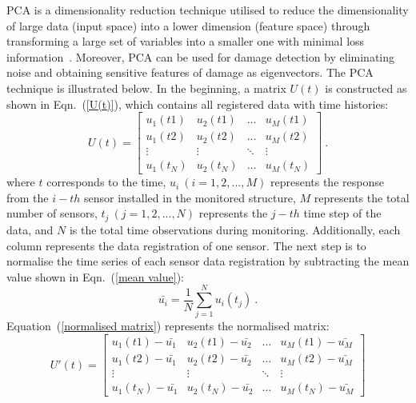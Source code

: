 PCA is a dimensionality reduction technique utilised to reduce the dimensionality of large data (input space) into a lower dimension (feature space) through transforming a large set of variables into a smaller one with minimal loss information~\cite{Jolliffe2002}.
Moreover, PCA can be used for damage detection by eliminating noise and obtaining sensitive features of damage as eigenvectors.
The PCA technique is illustrated below.
In the beginning, a matrix \(U(t)\) is constructed as shown in Eqn.~(\ref{U(t)}), which contains all registered data with time histories:
\begin{equation}
	U(t)=
	\begin{bmatrix}
		u_1{(t1)}       & u_2{(t1)} & \dots & u_M{(t1)} \\
		u_1{(t2)}       & u_2{(t2)} & \dots & u_M{(t2)} \\
		\vdots 			& \vdots 	& \ddots & \vdots \\
		u_1{(t_N)}      & u_2{(t_N)} & \dots & u_M{(t_N)}
	\end{bmatrix}\ .
	\label{U(t)}
\end{equation}
where \(t\) corresponds to the time, \(u_i\ (i = 1, 2, ..., M)\) represents the response from the \(i-th\) sensor installed in the monitored structure, \(M\) represents the total number of sensors, \(t_j\ (j = 1, 2, ..., N)\) represents the \(j-th\) time step of the data, and \(N\) is the total time observations during monitoring.
Additionally, each column represents the data registration of one sensor.
The next step is to normalise the time series of each sensor data registration by subtracting the mean value shown in Eqn.~(\ref{mean value}):
\begin{equation}
	\bar{u_i} = \frac{1}{N}\sum_{j=1}^{N}u_i(t_j)\ .
	\label{mean value}
\end{equation}
Equation~(\ref{normalised matrix}) represents the normalised matrix:
\begin{equation}
	U'(t)=
	\begin{bmatrix}
		u_1{(t1)}-\bar{u_1}       & u_2{(t1)}-\bar{u_2} & \dots  & u_M{(t1)}-\bar{u_M} \\
		u_1{(t2)}-\bar{u_1}       & u_2{(t2)}-\bar{u_2} & \dots  & u_M{(t2)}-\bar{u_M} \\
		\vdots 					  & \vdots 	  			& \ddots & \vdots \\
		u_1{(t_N)}-\bar{u_1}      & u_2{(t_N)}-\bar{u_2}& \dots  & u_M{(t_N)}-\bar{u_M}
	\end{bmatrix}
	\label{normalised matrix}
\end{equation}
